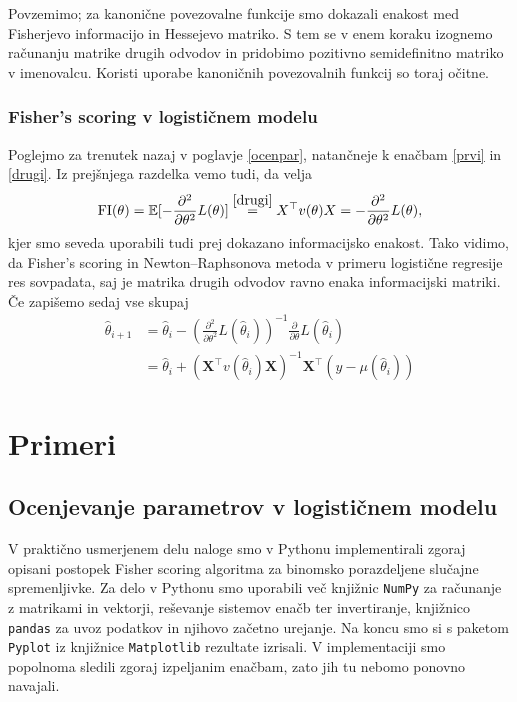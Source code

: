 \documentclass[12pt,a4paper]{amsart}
\theoremstyle{definition} %
\theoremstyle{plain} %
\begin{document}
Povzemimo; za kanonične povezovalne funkcije smo dokazali enakost med Fisherjevo informacijo in Hessejevo matriko. S tem se v enem koraku izognemo računanju matrike drugih 
odvodov in pridobimo pozitivno semidefinitno matriko v imenovalcu. Koristi uporabe kanoničnih povezovalnih funkcij so toraj očitne.

\subsubsection{Fisher's scoring v logističnem modelu}
Poglejmo za trenutek nazaj v poglavje \ref{ocenpar}, natančneje k enačbam \eqref{prvi} in \eqref{drugi}. Iz prejšnjega razdelka vemo tudi, da velja
\[
    \mathrm{FI}(\theta) = \mathbb{E}[-\frac{\partial^2}{\partial\theta^2} L(\theta)] \overset{\eqref{drugi}}{=} X^\top v(\theta)X = -\frac{\partial^2}{\partial\theta^2} L(\theta),
\]
kjer smo seveda uporabili tudi prej dokazano informacijsko enakost. Tako vidimo, da Fisher's scoring in Newton--Raphsonova metoda v primeru logistične regresije
res sovpadata, saj je matrika drugih odvodov ravno enaka informacijski matriki. Če zapišemo sedaj vse skupaj
\begin{align}
    \hat{\theta}_{i+1} &= \hat{\theta}_{i} - (\frac{\partial^2}{\partial\theta^2} L(\hat{\theta}_{i}))^{-1} \frac{\partial}{\partial\theta} L(\hat{\theta}_{i}) \nonumber \\
    &= \hat{\theta}_{i} + (\mathbf{X}^\top v(\hat{\theta}_{i}) \mathbf{X})^{-1}\mathbf{X}^\top(y - \mu(\hat{\theta}_{i})) 
\end{align}

\section{Primeri}
\subsection{Ocenjevanje parametrov v logističnem modelu}

V praktično usmerjenem delu naloge smo v Pythonu implementirali zgoraj opisani postopek Fisher scoring algoritma za binomsko porazdeljene slučajne
spremenljivke. Za delo v Pythonu smo uporabili več knjižnic\; \texttt{NumPy} za računanje z matrikami in vektorji, reševanje sistemov enačb ter invertiranje,
knjižnico \texttt{pandas} za uvoz podatkov in njihovo začetno urejanje. Na koncu smo si s paketom \texttt{Pyplot} iz knjižnice \texttt{Matplotlib} rezultate izrisali.
V implementaciji smo popolnoma sledili zgoraj izpeljanim enačbam, zato jih tu nebomo ponovno navajali.
\end{document}
